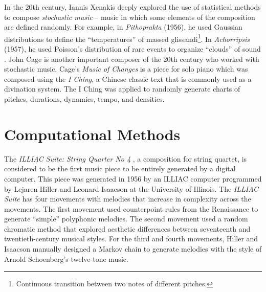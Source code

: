 In the 20th century, Iannis Xenakis deeply explored the use of statistical methods to compose \textit{stochastic music} \cite{xenakis1992formalized} -- music in which some elements of the composition are defined randomly. For example, in \textit{Pithoprakta} (1956), he used Gaussian distributions to define the ``temperatures'' of massed glissandi\footnote{Continuous transition between two notes of different pitches.}. In \textit{Achorripsis} (1957), he used Poisson's distribution of rare events to organize ``clouds'' of sound \cite{ames1987automated}. John Cage is another important composer of the 20th century who worked with stochastic music. Cage's \textit{Music of Changes} is a piece for solo piano which was composed using the \textit{I Ching}, a Chinese classic text that is commonly used as a divination system. The I Ching was applied to randomly generate charts of pitches, durations, dynamics, tempo, and densities.

\section{Computational Methods}

The \textit{ILLIAC Suite: String Quarter No 4} \cite{hiller1957musical}, a composition for string quartet, is considered to be the first music piece to be entirely generated by a digital computer. This piece was generated in 1956 by an ILLIAC computer programmed by Lejaren Hiller and Leonard Isaacson at the University of Illinois. The \textit{ILLIAC Suite} has four movements with melodies that increase in complexity across the movements. The first movement used counterpoint rules from the Renaissance to generate ``simple'' polyphonic melodies. The second movement used a random chromatic method that explored aesthetic differences between seventeenth and twentieth-century musical styles. For the third and fourth movements, Hiller and Isaacson manually designed a Markov chain to generate melodies with the style of Arnold Schoenberg's twelve-tone music.

